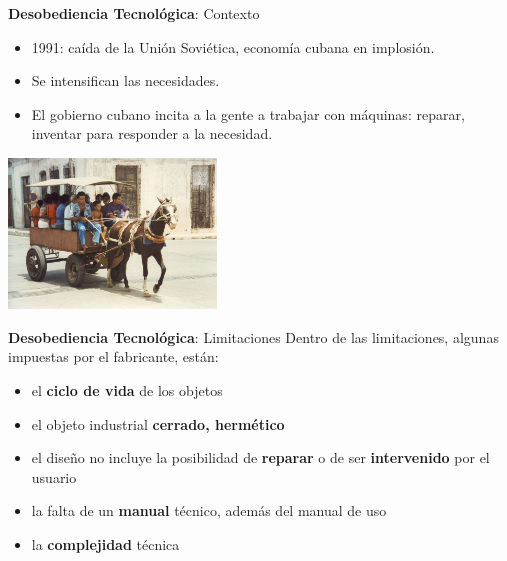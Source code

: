 \documentclass[spanish]{beamer}
\begin{document}
\begin{frame}{\textbf{Desobediencia Tecnológica}: Contexto}   
    \begin{itemize}        
        \item 1991: caída de la Unión Soviética, economía cubana en implosión.
        \item Se intensifican las necesidades.
        \item El gobierno cubano incita a la gente a trabajar con máquinas: reparar, inventar para responder a la necesidad.        
    \end{itemize}
    \begin{center}            
        \includegraphics[height=4cm]{img/periodo_especial.jpg}
    \end{center}
\end{frame}

\begin{frame}{\textbf{Desobediencia Tecnológica}: Limitaciones}      
    Dentro de las limitaciones, algunas impuestas por el fabricante, están:
    
    \begin{itemize}
        \item el \textbf{ciclo de vida} de los objetos 
        \item el objeto industrial \textbf{cerrado, hermético}
        \item el diseño no incluye la posibilidad de \textbf{reparar} o de ser \textbf{intervenido} por el usuario
        \item la falta de un \textbf{manual} técnico, además del manual de uso
        \item la \textbf{complejidad} técnica       
    \end{itemize}    
\end{frame}
\end{document}
